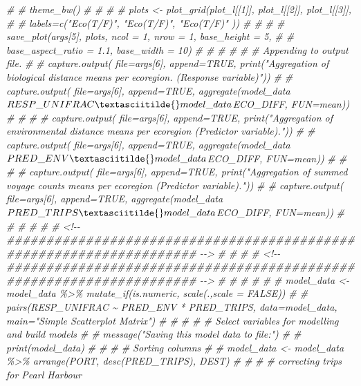 \documentclass[
]{article}
\newenvironment{Shaded}{\begin{snugshade}}{\end{snugshade}}
\newcommand{\CommentTok}[1]{\textcolor[rgb]{0.56,0.35,0.01}{\textit{#1}}}
\begin{document}
\begin{Shaded}
\begin{Highlighting}[]
\CommentTok{\# \#                theme\_bw()}
\CommentTok{\# \# }
\CommentTok{\# \# plots <{-} plot\_grid(plot\_l[[1]], plot\_l[[2]], plot\_l[[3]],}
\CommentTok{\# \#           labels=c("Eco(T/F)", "Eco(T/F)", "Eco(T/F)" ))}
\CommentTok{\# \# }
\CommentTok{\# \# save\_plot(args[5], plots, ncol = 1, nrow = 1, base\_height = 5,}
\CommentTok{\# \#   base\_aspect\_ratio = 1.1, base\_width = 10)}
\CommentTok{\# \#   }
\CommentTok{\# \# }
\CommentTok{\# \# Appending to output file.}
\CommentTok{\# \# capture.output( file=args[6], append=TRUE, print("Aggregation of biological distance means per ecoregion. (Response variable)"))}
\CommentTok{\# \# capture.output( file=args[6], append=TRUE, aggregate(model\_data$RESP\_UNIFRAC\textasciitilde{}model\_data$ECO\_DIFF, FUN=mean))}
\CommentTok{\# \# }
\CommentTok{\# \# capture.output( file=args[6], append=TRUE, print("Aggregation of environmental distance means per ecoregion (Predictor variable)."))}
\CommentTok{\# \# capture.output( file=args[6], append=TRUE, aggregate(model\_data$PRED\_ENV\textasciitilde{}model\_data$ECO\_DIFF, FUN=mean))}
\CommentTok{\# \# }
\CommentTok{\# \# capture.output( file=args[6], append=TRUE, print("Aggregation of summed voyage counts means per ecoregion (Predictor variable)."))}
\CommentTok{\# \# capture.output( file=args[6], append=TRUE, aggregate(model\_data$PRED\_TRIPS\textasciitilde{}model\_data$ECO\_DIFF, FUN=mean))}
\CommentTok{\# \# }
\CommentTok{\# \# \textquotesingle{}}
\CommentTok{\# \# \textquotesingle{} <!{-}{-} \#\#\#\#\#\#\#\#\#\#\#\#\#\#\#\#\#\#\#\#\#\#\#\#\#\#\#\#\#\#\#\#\#\#\#\#\#\#\#\#\#\#\#\#\#\#\#\#\#\#\#\#\#\#\#\#\#\#\#\#\#\#\#\#\#\#\#\# {-}{-}>}
\CommentTok{\# \# \textquotesingle{}}
\CommentTok{\# \# \textquotesingle{} <!{-}{-} \#\#\#\#\#\#\#\#\#\#\#\#\#\#\#\#\#\#\#\#\#\#\#\#\#\#\#\#\#\#\#\#\#\#\#\#\#\#\#\#\#\#\#\#\#\#\#\#\#\#\#\#\#\#\#\#\#\#\#\#\#\#\#\#\#\#\#\# {-}{-}>}
\CommentTok{\# \# \textquotesingle{}}
\CommentTok{\# \# }
\CommentTok{\# \# model\_data <{-} model\_data \%>\%  mutate\_if(is.numeric, scale(.,scale = FALSE))}
\CommentTok{\# \# pairs(RESP\_UNIFRAC \textasciitilde{} PRED\_ENV * PRED\_TRIPS, data=model\_data, main="Simple Scatterplot Matrix")}
\CommentTok{\# \# }
\CommentTok{\# \# \textquotesingle{} \# Select variables for modelling and build models }
\CommentTok{\# \# message("Saving this model data to file:")}
\CommentTok{\# \# print(model\_data)}
\CommentTok{\# \# }
\CommentTok{\# \# Sorting columns}
\CommentTok{\# \# model\_data <{-} model\_data \%>\% arrange(PORT, desc(PRED\_TRIPS), DEST)}
\CommentTok{\# \# }
\CommentTok{\# \# correcting trips for Pearl Harbour}

\end{Highlighting}
\end{Shaded}
\end{document}

